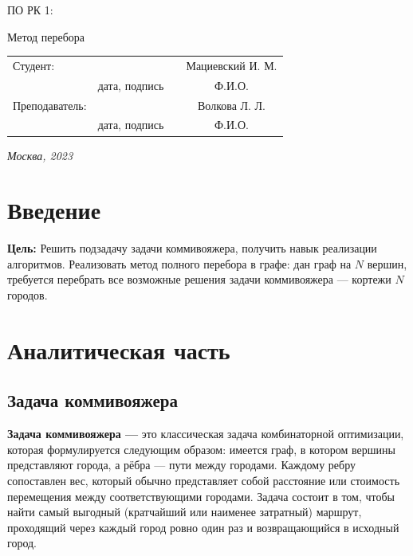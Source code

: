 \documentclass[12pt, a4paper]{article}
\begin{document}
\begin{titlepage}
\begin{center}
\begin{bf}
    \fontsize{20}{30}\selectfont
    ПО РК 1:

    Метод перебора
   \end{bf}
  \end{center}

  \fontsize{14}{21}\selectfont
  \vspace{5cm}


  \noindent\begin{tabularx}{\textwidth}{ X >{\centering}p{4cm} p{1cm} c }
   Студент: & & & Мациевский И. М. \\ \cline{2-2} \cline{4-4}
   & \fontsize{10}{15}\selectfont дата, подпись & & \fontsize{10}{15}\selectfont Ф.И.О. \\
   Преподаватель: & & & Волкова Л. Л.\\ \cline{2-2} \cline{4-4}
   & \fontsize{10}{15}\selectfont дата, подпись & & \fontsize{10}{15}\selectfont Ф.И.О.
   \end{tabularx}

  \vspace{\fill}

  \begin{center}
   \it{Москва}, 2023
  \end{center}

  \thispagestyle{empty}
\end{titlepage}\newpage
\tableofcontents
\newpage
\section*{Введение}
\justifying
\textbf{Цель:}
Решить подзадачу задачи коммивояжера, получить навык 
реализации алгоритмов.
Реализовать метод полного перебора в графе: дан граф на $N$ 
вершин, требуется перебрать все возможные решения 
задачи коммивояжера --- кортежи $N$ городов.
\section{Аналитическая часть}
\subsection{Задача коммивояжера}
\textbf{Задача коммивояжера ---} это классическая задача 
комбинаторной оптимизации, которая формулируется следующим 
образом: 
имеется граф, в котором вершины представляют города, а рёбра — 
пути между городами. Каждому ребру сопоставлен вес, который обычно 
представляет собой расстояние или стоимость перемещения между 
соответствующими городами. Задача состоит в том, чтобы найти самый 
выгодный (кратчайший или наименее затратный) маршрут, проходящий 
через каждый город ровно один раз и возвращающийся в исходный 
город.
\end{document}

